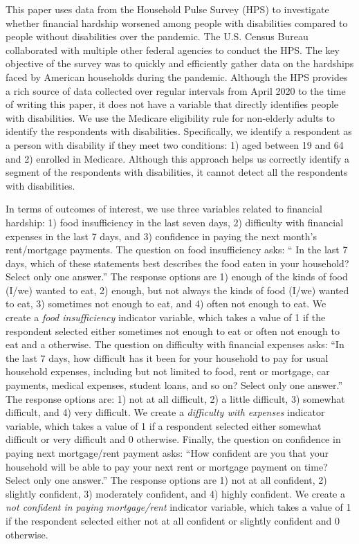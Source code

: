 \documentclass[12pt]{article}
\begin{document}
This paper uses data from the Household Pulse Survey (HPS) to investigate whether financial hardship worsened among people with disabilities compared to people without disabilities over the pandemic. The U.S. Census Bureau collaborated with multiple other federal agencies to conduct the HPS. The key objective of the survey was to quickly and efficiently gather data on the hardships faced by American households during the pandemic. Although the HPS provides a rich source of data collected over regular intervals from April 2020 to the time of writing this paper, it does not have a variable that directly identifies people with disabilities. We use the Medicare eligibility rule for non-elderly adults to identify the respondents with disabilities. Specifically, we identify a respondent as a person with disability if they meet two conditions: 1) aged between 19 and 64 and 2) enrolled in Medicare. Although this approach helps us correctly identify a segment of the respondents with disabilities, it cannot detect all the respondents with disabilities. 

In terms of outcomes of interest, we use three variables related to financial hardship: 1) food insufficiency in the last seven days, 2) difficulty with financial expenses in the last 7 days, and 3) confidence in paying the next month's rent/mortgage payments. The question on food insufficiency asks:  `` In the last 7 days, which of these statements best describes the food eaten in your household? Select only one answer.'' The response options are 1) enough of the kinds of food (I/we) wanted to eat, 2) enough, but not always the kinds of food (I/we) wanted to eat, 3) sometimes not enough to eat, and 4) often not enough to eat. We create a \emph{food insufficiency} indicator variable, which takes a value of 1 if the respondent selected either sometimes not enough to eat or often not enough to eat and a otherwise. The question on difficulty with financial expenses asks: ``In the last 7 days, how difficult has it been for your household to pay for usual household expenses, including but not limited to food, rent or mortgage, car payments, medical expenses, student loans, and so on? Select only one answer.'' The response options are: 1) not at all difficult, 2) a little difficult, 3) somewhat difficult, and 4) very difficult. We create a \emph{difficulty with expenses} indicator variable, which takes a value of 1 if a respondent selected either somewhat difficult or very difficult and 0 otherwise. Finally, the question on confidence in paying next mortgage/rent payment asks: ``How confident are you that your household will be able to pay your next rent or mortgage payment on time? Select only one answer.'' The response options are 1) not at all confident, 2) slightly confident, 3) moderately confident, and 4) highly confident. We create a \emph{not confident in paying mortgage/rent} indicator variable, which takes a value of 1 if the respondent selected either not at all confident or slightly confident and 0 otherwise.
\end{document}
